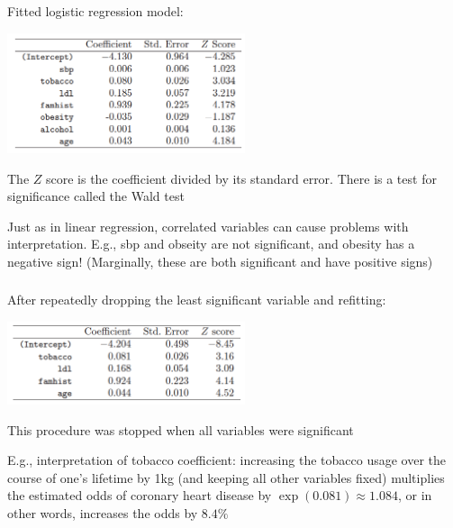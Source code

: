 \documentclass[mathserif]{beamer}
\def\red{\color[rgb]{0.8,0,0}}
\begin{document}
\begin{frame}
\frametitle{}
\smallskip
\smallskip
Fitted logistic regression model:
\begin{center}
\includegraphics[width=2.75in]{salr1.png}
\end{center}
The $Z$ score is the coefficient divided by its standard error. 
There is a test for significance called the Wald test

\bigskip
Just as in linear regression, {\red correlated variables} can cause problems with
interpretation. E.g.,
sbp and obseity are not significant, and obesity has a negative sign! (Marginally, 
these are both significant and have positive signs) 
\end{frame}

\begin{frame}
\frametitle{}
\bigskip
After repeatedly dropping the least significant variable and refitting:
\begin{center}
\includegraphics[width=2.75in]{salr2.png}
\end{center}
This procedure was stopped when all variables were significant

\bigskip
E.g., interpretation of tobacco coefficient: increasing the tobacco 
usage over the course of one's lifetime by 1kg (and keeping all other 
variables fixed) multiplies the estimated odds of coronary heart 
disease by $\exp(0.081) \approx 1.084$, or in other words, increases 
the odds by $8.4\%$
\end{frame}
\end{document}
